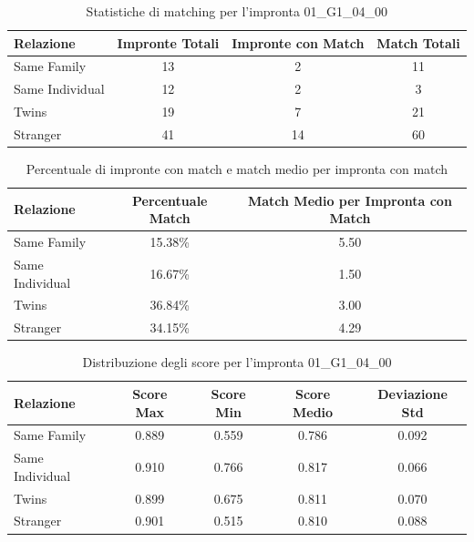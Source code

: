 \begin{table}[htbp]
\centering
\caption{Statistiche di matching per l'impronta 01\_G1\_04\_00}
\label{tab:results_01_G1_04_00}
\begin{tabular}{|l|c|c|c|}
\hline
\textbf{Relazione} & \textbf{Impronte Totali} & \textbf{Impronte con Match} & \textbf{Match Totali} \\
\hline
Same Family & 13 & 2 & 11 \\
\hline
Same Individual & 12 & 2 & 3 \\
\hline
Twins & 19 & 7 & 21 \\
\hline
Stranger & 41 & 14 & 60 \\
\hline
\end{tabular}
\end{table}


\begin{table}[htbp]
\centering
\caption{Percentuale di impronte con match e match medio per impronta con match}
\label{tab:match_percentage_01_G1_04_00}
\begin{tabular}{|l|c|c|}
\hline
\textbf{Relazione} & \textbf{Percentuale Match} & \textbf{Match Medio per Impronta con Match} \\
\hline
Same Family & 15.38\% & 5.50 \\
\hline
Same Individual & 16.67\% & 1.50 \\
\hline
Twins & 36.84\% & 3.00 \\
\hline
Stranger & 34.15\% & 4.29 \\
\hline
\end{tabular}
\end{table}


\begin{table}[htbp]
\centering
\caption{Distribuzione degli score per l'impronta 01\_G1\_04\_00}
\label{tab:scores_01_G1_04_00}
\begin{tabular}{|l|c|c|c|c|}
\hline
\textbf{Relazione} & \textbf{Score Max} & \textbf{Score Min} & \textbf{Score Medio} & \textbf{Deviazione Std} \\
\hline
Same Family & 0.889 & 0.559 & 0.786 & 0.092 \\
\hline
Same Individual & 0.910 & 0.766 & 0.817 & 0.066 \\
\hline
Twins & 0.899 & 0.675 & 0.811 & 0.070 \\
\hline
Stranger & 0.901 & 0.515 & 0.810 & 0.088 \\
\hline
\end{tabular}
\end{table}

